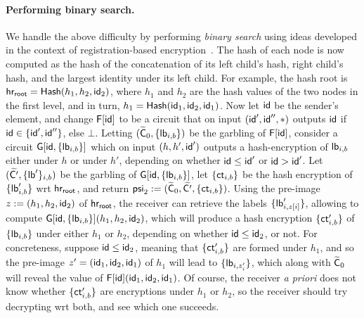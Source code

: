 \paragraph{Performing binary search.} We handle the above difficulty by performing \emph{binary search}  using ideas developed in the context of registration-based encryption~\cite{TCC:GHMR18}.  The hash of each node is now computed as the hash of the concatenation of its left child's hash, right child's hash, and the largest identity under its left child. For example, the hash root is $\mathsf{hr_{root}} = \mathsf{Hash}(h_1, h_2 , \mathsf{id}_2)$, where $h_1$ and $h_2$ are the hash values of the two nodes in the first level, and in turn,   $h_1 = \mathsf{Hash}(\mathsf{id}_1, \mathsf{id}_2 , \mathsf{id}_1 )$. Now let $\mathsf{id}$ be the sender's element, and change $\mathsf{F}[\mathsf{id}]$ to be a circuit that on input $(\mathsf{id}', \mathsf{id}'', *)$ outputs $\mathsf{id}$ if $\mathsf{id} \in \{ \mathsf{id}', \mathsf{id}''\}$, else $\bot$. Letting $(\widetilde{\mathsf{C}}_0, \{\mathsf{lb}_{i,b} \})$ be the garbling of $\mathsf{F}[\mathsf{id}]$, consider a circuit $\mathsf{G}[\mathsf{id}, \{\mathsf{lb}_{i,b}\}]$ which on input $(h,h', \mathsf{id}')$ outputs  a hash-encryption of $\mathsf{lb}_{i,b}$ either under $h$ or under $h'$, depending on whether $\mathsf{id} \leq \mathsf{id}'$ or $\mathsf{id} > \mathsf{id}'$. Let $(\widetilde{\mathsf{C}'} , \{\mathsf{lb}' \}_{i,b})$ be the garbling of $\mathsf{G}[\mathsf{id}, \{\mathsf{lb}_{i,b}\}]$, let $\{ \mathsf{ct}_{i,b} \}$ be the hash encryption of $\{\mathsf{lb}'_{i,b} \}$ wrt $\mathsf{hr_{root}}$, and return $\mathsf{psi}_2 := (\widetilde{\mathsf{C}}_0 , \widetilde{\mathsf{C}'}, \{\mathsf{ct}_{i,b} \}  )$. Using the pre-image $z := (h_1, h_2, \mathsf{id}_2)$ of $\mathsf{hr_{root}}$, the receiver can retrieve the labels $\{ \mathsf{lb}'_{i, z[i] }\}$, allowing to compute $\mathsf{G}[\mathsf{id}, \{\mathsf{lb}_{i,b}\}](h_1, h_2, \mathsf{id}_2)$, which will produce a hash encryption $\{\mathsf{ct}'_{i,b} \}$ of $ \{ \mathsf{lb}_{i,b}\}$ under either $h_1$ or $h_2$, depending on whether $\mathsf{id} \leq \mathsf{id}_2$, or not. For concreteness, suppose $\mathsf{id} \leq \mathsf{id}_2$, meaning that $\{\mathsf{ct}'_{i,b} \}$ are formed under $h_1$, and so the pre-image $z' = (\mathsf{id}_1, \mathsf{id}_2, \mathsf{id}_1)$ of $h_1$ will lead to $\{ \mathsf{lb}_{i, z'_i} \}$, which along with $\widetilde{\mathsf{C}}_0$ will reveal the value of $\mathsf{F}[\mathsf{id}](\mathsf{id}_1, \mathsf{id}_2, \mathsf{id}_1)$. Of course, the receiver \emph{a priori} does not know whether $\{\mathsf{ct}'_{i,b} \}$ are encryptions under $h_1$ or $h_2$, so the receiver should try decrypting wrt both, and see which one succeeds.

